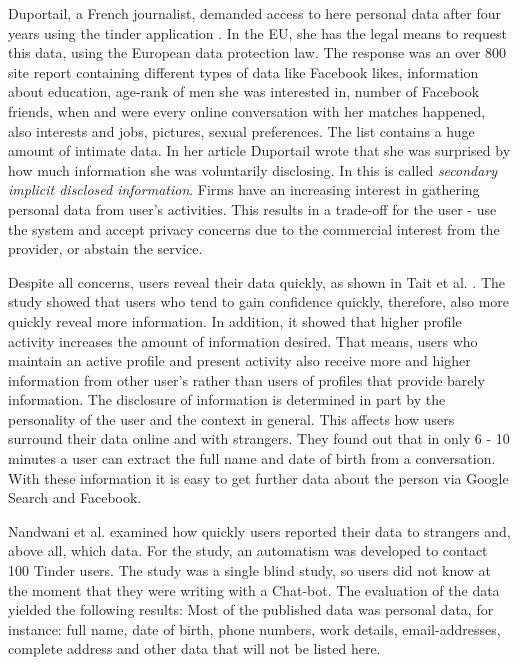 Duportail, a French journalist, demanded access to here personal data after four years using the tinder application \cite{taylor2009privacy}. In the \acs{EU}, she has the legal means to request this data, using the European data protection law. The response was an over 800 site report containing different types of data like Facebook likes, information about education, age-rank of men she was interested in, number of Facebook friends, when and were every online conversation with her matches happened, also interests and jobs, pictures, sexual preferences. The list contains a huge amount of intimate data. In her article Duportail wrote that she was surprised by how much information she was voluntarily disclosing.
In \cite{taylor2009privacy} this is called \textit{secondary implicit disclosed information}. Firms have an increasing interest in gathering personal data from user's activities. This results in a trade-off for the user - use the system and accept privacy concerns due to the commercial interest from the provider, or abstain the service.

Despite all concerns, users reveal their data quickly, as shown in Tait et al. \cite{tait2015hello}. 
The study showed that users who tend to gain confidence quickly, therefore, also more quickly reveal more information. In addition, it showed that higher profile activity increases the amount of information desired. 
That means, users who maintain an active profile and present activity also receive more and higher information from other user's rather than users of profiles that provide barely information. The disclosure of information is determined in part by the personality of the user and the context in general. This affects how users surround their data online and with strangers. They found out that in only 6 - 10 minutes a user can extract the full name and date of birth from a conversation. With these information it is easy to get further data about the person via Google Search and Facebook.

Nandwani et al. \cite{10.1007/978-3-319-61542-4_32} examined how quickly users reported their data to strangers and, above all, which data. For the study, an automatism was developed to contact 100 Tinder users. The study was a single blind study, so users did not know at the moment that they were writing with a Chat-bot. The evaluation of the data yielded the following results: Most of the published data was personal data, for instance: full name, date of birth, phone numbers, work details, email-addresses, complete address and other data that will not be listed here.

